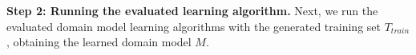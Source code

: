 \documentclass[letterpaper]{article} %
\newcommand{\tuple}[1]{\ensuremath{\left \langle #1 \right \rangle }}
\newcommand{\T}{T}
\newcommand{\Ttrain}{\T_{\textit{train}}}
\newcommand{\miniparagraph}[1]{\textbf{#1.}}
\newif\ifaddcomments
\newcommand{\roni}[1]{\ifaddcomments{\textcolor{red}{[Roni: #1]}}\fi}
\newcommand{\argaman}[1]{\ifaddcomments{\textcolor{blue}{[Argaman: #1]}}\fi}
\newcommand{\leo}[1]{\ifaddcomments{\textcolor{pink}{[Leonardo: #1]}}\fi}
\begin{document}
%
%

%
\miniparagraph{Step 2: Running the evaluated learning algorithm}
Next, we run the evaluated domain model learning algorithms with the generated training set $\Ttrain$, obtaining the learned domain model $M$. 
\end{document}
